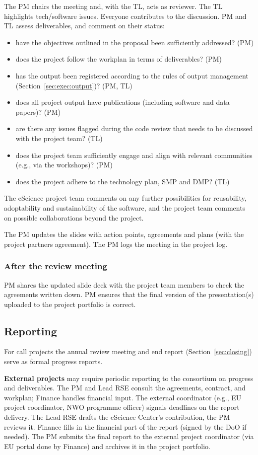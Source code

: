 The PM chairs the meeting and, with the TL, acts as reviewer. The TL highlights tech/software issues. Everyone contributes to the discussion. PM and TL assess deliverables, and comment on their status:
\begin{itemize}\itemsep0em
\item have the objectives outlined in the proposal been sufficiently addressed? (PM)
\item does the project follow the workplan in terms of deliverables? (PM)
\item has the output been registered according to the rules of output management (Section~\ref{sec:exec:output})? (PM, TL)
\item does all project output have publications (including software and data papers)? (PM)
\item are there any issues flagged during the code review that needs to be discussed with the project team? (TL)
\item does the project team sufficiently engage and align with relevant communities (e.g., via the workshops)? (PM)
\item does the project adhere to the technology plan, SMP and DMP? (TL)
\end{itemize}

The eScience project team comments on any further possibilities for reusability, adoptability and sustainability of the
software, and the project team comments on possible collaborations beyond the project.

The PM updates the slides with action points, agreements and plans (with the project partners agreement). The PM logs
the meeting in the project log.

\subsubsection{After the review meeting}
PM shares the updated slide deck with the project team members to check the agreements written down. PM ensures that the
final version of the presentation(s) uploaded to the project portfolio is correct.

\subsection{Reporting}
\label{sec:exec:report}
For call projects the annual review meeting and end report (Section~\ref{sec:closing}) serve as formal progress reports.

\textbf{External projects} may require periodic reporting to the consortium on progress and deliverables. 
The PM and Lead RSE consult the agreements, contract, and workplan; Finance handles financial input. 
The external coordinator (e.g., EU project coordinator, NWO programme officer) signals deadlines on the report delivery. 
The Lead RSE drafts the eScience Center's contribution, the PM reviews it. Finance fills in the financial part of the report 
(signed by the DoO if needed). The PM submits the final report to the external project coordinator 
(via EU portal done by Finance) and archives it in the project portfolio.

